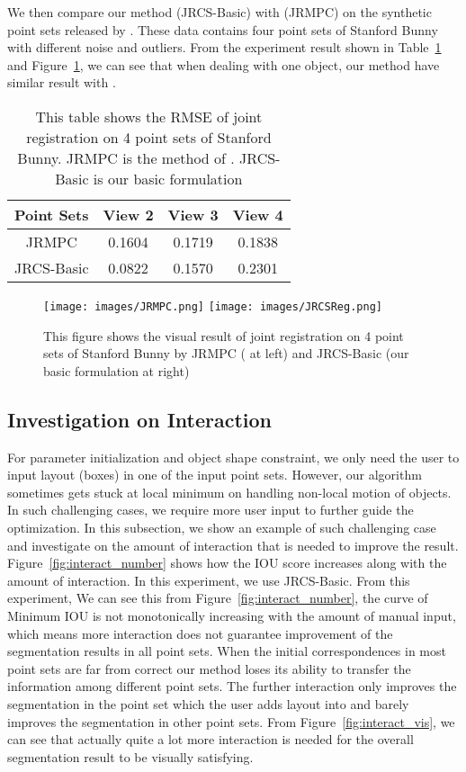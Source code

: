 We then compare our method (JRCS-Basic) with \cite{Evangelidis2014}(JRMPC) on the synthetic point sets released by \cite{Evangelidis2014}. These data contains four point sets of Stanford Bunny with different noise and outliers. From the experiment result shown in Table~\ref{tab:reg} and Figure~\ref{fig:reg}, we can see that when dealing with one object, our method have similar result with \cite{Evangelidis2014}.

\begin{table}
	\centering
	\caption{This table shows the RMSE of joint registration on 4 point sets of Stanford Bunny. JRMPC is the method of \cite{Evangelidis2014}. JRCS-Basic is our basic formulation}
	\begin{tabular}{c c c c}
		Point Sets& View 2 & View 3 & View 4 \\
		\hline
		JRMPC & 0.1604 & 0.1719 & 0.1838\\   
		JRCS-Basic & 0.0822 &  0.1570  & 0.2301\\
	\end{tabular}
	\label{tab:reg}
\end{table}
\begin{figure}[htb]
	\centering
	\texttt{[image: images/JRMPC.png]}
	\texttt{[image: images/JRCSReg.png]}
	\caption{This figure shows the visual result of joint registration on 4 point sets of Stanford Bunny by JRMPC (\cite{Evangelidis2014} at left) and JRCS-Basic (our basic formulation at right)}
	\label{fig:reg}
\end{figure}

\subsection{Investigation on Interaction}
\label{subsec:interact}

For parameter initialization and object shape constraint, we only need the user to input layout (boxes) in one of the input point sets. However, our algorithm sometimes gets stuck at local minimum on handling non-local motion of objects. In such challenging cases, we require more user input to further guide the optimization. In this subsection, we show an example of such challenging case and investigate on the amount of interaction that is needed to improve the result. Figure~\ref{fig:interact_number} shows how the IOU score increases along with the amount of interaction. In this experiment, we use JRCS-Basic. From this experiment,  We can see this from Figure~\ref{fig:interact_number}, the curve of Minimum IOU is not monotonically increasing with the amount of manual input, which means more interaction does not guarantee improvement of the segmentation results in all point sets.  When the initial correspondences in most point sets are far from correct our method loses its ability to transfer the information among different point sets. The further interaction only improves the segmentation in the point set which the user adds layout into and barely improves the segmentation in other point sets.
From Figure~\ref{fig:interact_vis}, we can see that actually quite a lot more interaction is needed for the overall segmentation result to be visually satisfying.
 
